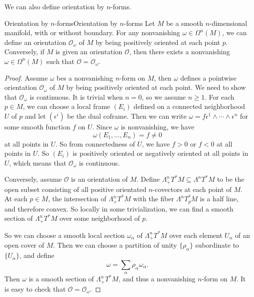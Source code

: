 \documentclass[../main.tex]{subfiles}
\begin{document}
We can also define orientation by $n$-forms.
\begin{proposition}{Orientation by $n$-forms}{Orientation by $n$-forms}
  Let $M$ be a smooth $n$-dimensional manifold, with or without boundary. For any nonvanishing $\omega \in \Omega^n(M)$, we can define an orientation $\mathcal{O}_\omega$ of $M$ by being positively oriented at each point $p$. Conversely, if $M$ is given an orientation $\mathcal{O}$, then there exists a nonvanishing $\omega \in \Omega^n(M)$ such that $\mathcal{O} = \mathcal{O}_\omega$.
\end{proposition}
\begin{proof}
  Assume $\omega$ bes a nonvanishing $n$-form on $M$, then $\omega$ defines a pointwise orientation $\mathcal{O}_\omega$ of $M$ by being positively oriented at each point. We need to show that $\mathcal{O}_\omega$ is continuous. It is trivial when $n=0$, so we assume $n \geq 1$. For each $p \in M$, we can choose a local frame $(E_i)$ defined on a connected neighborhood $U$ of $p$ and let $(\epsilon^i)$ be the dual coframe. Then we can write $\omega = f \epsilon^1 \wedge \cdots \wedge \epsilon^n$ for some smooth function $f$ on $U$. Since $\omega$ is nonvanishing, we have
  \begin{equation*}
    \omega(E_1, \ldots , E_n) = f \neq 0
  \end{equation*}
  at all points in $U$. So from connectedness of $U$, we have $f > 0$ or $f < 0$ at all points in $U$. So $(E_i)$ is positively oriented or negatively oriented at all points in $U$, which means that $\mathcal{O}_\omega$ is continuous.

  Conversely, assume $\mathcal{O}$ is an orientation of $M$. Define $\Lambda_+^n T^*M \subseteq \Lambda^n T^*M$ to be the open subset consisting of all positive orientated $n$-covectors at each point of $M$. At each $p\in M$, the intersection of $\Lambda_+^n T^*M$ with the fiber $\Lambda^n T_p^*M$ is a half line, and therefore convex. So locally in some trivialization, we can find a smooth section of $\Lambda_+^n T^*M$ over some neighborhood of $p$.

  So we can choose a smooth local section $\omega_\alpha$ of $\Lambda_+^n T^*M$ over each element $U_\alpha$ of an open cover of $M$. Then we can choose a partition of unity $\{\rho_\alpha\}$ subordinate to $\{U_\alpha\}$, and define
  \begin{equation*}
    \omega = \sum_\alpha \rho_\alpha \omega_\alpha.
  \end{equation*}
  Then $\omega$ is a smooth section of $\Lambda_+^n T^*M$, and thus a nonvanishing $n$-form on $M$. It is easy to check that $\mathcal{O} = \mathcal{O}_\omega$.
\end{proof}
\end{document}
